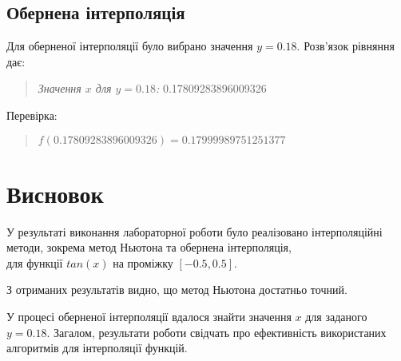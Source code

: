 \documentclass[a4paper, 12pt]{article}
\begin{document}
\subsection{Обернена інтерполяція}

Для оберненої інтерполяції було вибрано значення \( y = 0.18 \). Розв'язок рівняння дає:

\begin{quote}
\textit{Значення \( x \) для \( y = 0.18 \):} 0.17809283896009326
\end{quote}

Перевірка:

\begin{quote}
\( f(0.17809283896009326) = 0.17999989751251377 \)
\end{quote}


\newpage
\section{Висновок}

У результаті виконання лабораторної роботи було реалізовано інтерполяційні методи, зокрема метод Ньютона та обернена інтерполяція, \\
для функції $tan(x)$ на проміжку $[-0.5, 0.5]$. 

З отриманих результатів видно, що метод Ньютона достатньо точний.

У процесі оберненої інтерполяції вдалося знайти значення $x$ для заданого $y=0.18$.
Загалом, результати роботи свідчать про ефективність використаних алгоритмів для інтерполяції функцій.
\end{document}
